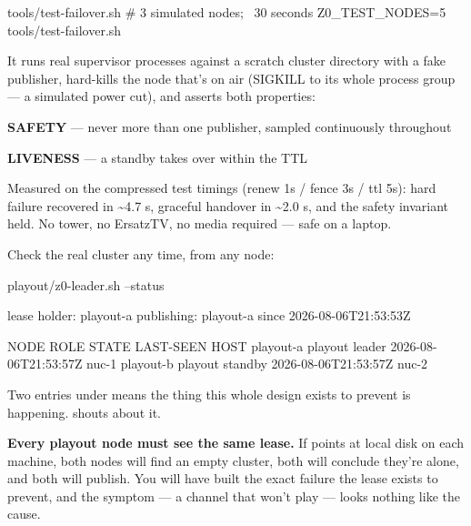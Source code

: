 \documentclass[fontpath=fonts/,logopath=logo/]{riposte-doc}
\begin{document}
\ripcodeopen
{}
\begin{ripcodeblock}
tools/test-failover.sh          # 3 simulated nodes; ~30 seconds
Z0_TEST_NODES=5 tools/test-failover.sh
\end{ripcodeblock}
\ripcodesizereset\ripcodeclose

It runs real supervisor processes against a scratch cluster directory with a fake publisher, hard-kills the node that's on air (SIGKILL to its whole process group — a simulated power cut), and asserts both properties:

\begin{ripbullets}
\item \textbf{SAFETY} — never more than one publisher, sampled continuously throughout
\item \textbf{LIVENESS} — a standby takes over within the TTL
\end{ripbullets}

Measured on the compressed test timings (renew 1s / fence 3s / ttl 5s): hard failure recovered in \textasciitilde{}4.7 s, graceful handover in \textasciitilde{}2.0 s, and the safety invariant held. No tower, no ErsatzTV, no media required — safe on a laptop.

Check the real cluster any time, from any node:

\ripcodeopen
{}
\begin{ripcodeblock}
playout/z0-leader.sh --status
\end{ripcodeblock}
\ripcodesizereset\ripcodeclose

\ripcodeopen
{}
\begin{ripcodeblock}
lease holder: playout-a
publishing:
  playout-a  since 2026-08-06T21:53:53Z

NODE             ROLE      STATE     LAST-SEEN              HOST
playout-a        playout   leader    2026-08-06T21:53:57Z   nuc-1
playout-b        playout   standby   2026-08-06T21:53:57Z   nuc-2
\end{ripcodeblock}
\ripcodesizereset\ripcodeclose

Two entries under  means the thing this whole design exists to prevent is happening.  shouts about it.



\textbf{Every playout node must see the same lease.} If  points at local disk on each machine, both nodes will find an empty cluster, both will conclude they're alone, and both will publish. You will have built the exact failure the lease exists to prevent, and the symptom — a channel that won't play — looks nothing like the cause.
\end{document}
